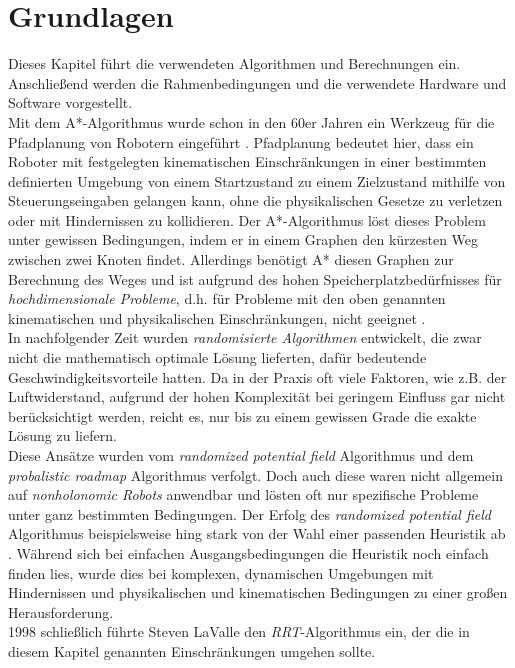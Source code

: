 \section{Grundlagen}
\label{sec:Grundlagen}
Dieses Kapitel führt die verwendeten Algorithmen und Berechnungen ein. Anschließend werden die Rahmenbedingungen und die verwendete Hardware und Software vorgestellt.\\
Mit dem A*-Algorithmus wurde schon in den 60er Jahren ein Werkzeug für die Pfadplanung von Robotern eingeführt \citep{astar68}. Pfadplanung bedeutet hier, dass ein Roboter mit festgelegten kinematischen Einschränkungen in einer bestimmten definierten Umgebung von einem Startzustand zu einem Zielzustand mithilfe von Steuerungseingaben gelangen kann, ohne die physikalischen Gesetze zu verletzen oder mit Hindernissen zu kollidieren. Der A*-Algorithmus löst dieses Problem unter gewissen Bedingungen, indem er in einem Graphen den kürzesten Weg zwischen zwei Knoten findet. Allerdings benötigt A* diesen Graphen zur Berechnung des Weges und ist aufgrund des hohen Speicherplatzbedürfnisses für \textit{hochdimensionale Probleme}, d.h. für Probleme mit den oben genannten kinematischen und physikalischen Einschränkungen, nicht geeignet \citep{astar68}.\\
In nachfolgender Zeit wurden \textit{randomisierte Algorithmen} entwickelt, die zwar nicht die mathematisch optimale Lösung lieferten, dafür bedeutende Geschwindigkeitsvorteile hatten. Da in der Praxis oft viele Faktoren, wie z.B. der Luftwiderstand, aufgrund der hohen Komplexität bei geringem Einfluss gar nicht berücksichtigt werden, reicht es, nur bis zu einem gewissen Grade die exakte Lösung zu liefern. \\
Diese Ansätze wurden vom \textit{randomized potential field} Algorithmus \citep{BaLa91} und dem \textit{probalistic roadmap} Algorithmus \citep{AmWu96} verfolgt. Doch auch diese waren nicht allgemein auf \textit{nonholonomic Robots} anwendbar und lösten oft nur spezifische Probleme unter ganz bestimmten Bedingungen. Der Erfolg des \textit{randomized potential field} Algorithmus beispielsweise hing stark von der Wahl einer passenden Heuristik ab \citep[vgl. Kap 3.4 in ][]{BaLa91}. Während sich bei einfachen Ausgangsbedingungen die Heuristik noch einfach finden lies, wurde dies bei komplexen, dynamischen Umgebungen mit Hindernissen und	 physikalischen und kinematischen Bedingungen zu einer großen Herausforderung. \\
1998 schließlich führte Steven LaValle den \textit{RRT}-Algorithmus ein, der die in diesem Kapitel genannten Einschränkungen umgehen sollte.

